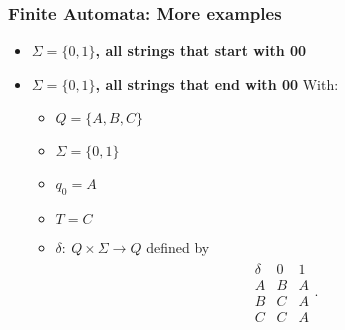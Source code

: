 \documentclass{report}
\begin{document}
\begin{itemize}
    








    \end{itemize}

    \pagebreak 
    \subsubsection{Finite Automata: More examples}
    \begin{itemize}
        \item \textbf{$\Sigma = \{0,1\}$, all strings that start with 00}
        \item \textbf{$\Sigma = \{0,1\}$, all strings that end with 00}
            \bigbreak \noindent 
            \bigbreak \noindent 
            With:
            \begin{itemize}
                \item $Q = \{A,B,C\}$
                \item $\Sigma = \{0,1\}$
                \item $q_{0} = A$
                \item $T = C$
                \item $\delta:\ Q \times \Sigma \to  Q$ defined by                
                    \begin{align*}
                        \begin{array}{c|cc}
                            \delta & 0 & 1 \\
                            \hline
                            A & B & A\\
                            B & C & A\\
                            C & C & A
                        \end{array}
                    .\end{align*}
            \end{itemize}
                
    \end{itemize}


    \pagebreak 
\end{document}
